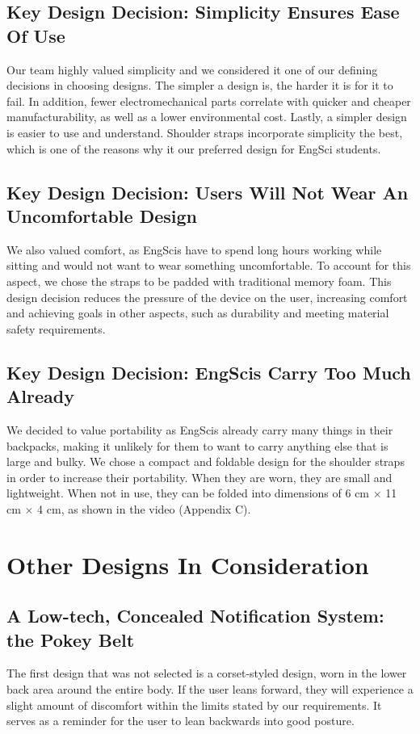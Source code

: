 \documentclass[11pt]{article}
\begin{document}
\subsection{Key Design Decision: Simplicity Ensures Ease Of Use}
Our team highly valued simplicity and we considered it one of our defining decisions in choosing designs. The simpler a design is, the harder it is for it to fail. In addition, fewer electromechanical parts correlate with quicker and cheaper manufacturability, as well as a lower environmental cost. Lastly, a simpler design is easier to use and understand. Shoulder straps incorporate simplicity the best, which is one of the reasons why it our preferred design for EngSci students.

\subsection{Key Design Decision: Users Will Not Wear An Uncomfortable Design}
We also valued comfort, as EngScis have to spend long hours working while sitting and would not want to wear something uncomfortable. To account for this aspect, we chose the straps to be padded with traditional memory foam. This design decision reduces the pressure of the device on the user, increasing comfort and achieving goals in other aspects, such as durability and meeting material safety requirements.

\subsection{Key Design Decision: EngScis Carry Too Much Already }
We decided to value portability as EngScis already carry many things in their backpacks, making it unlikely for them to want to carry anything else that is large and bulky. We chose a compact and foldable design for the shoulder straps in order to increase their portability. When they are worn, they are small and lightweight. When not in use, they can be folded into dimensions of 6 cm $\times$ 11 cm $\times$ 4 cm, as shown in the video (Appendix C).

\section{Other Designs In Consideration} 

\subsection{A Low-tech, Concealed Notification System: the Pokey Belt}
The first design that was not selected is a corset-styled design, worn in the lower back area around the entire body. If the user leans forward, they will experience a slight amount of discomfort within the limits stated by our requirements. It serves as a reminder for the user to lean backwards into good posture.
\end{document}
